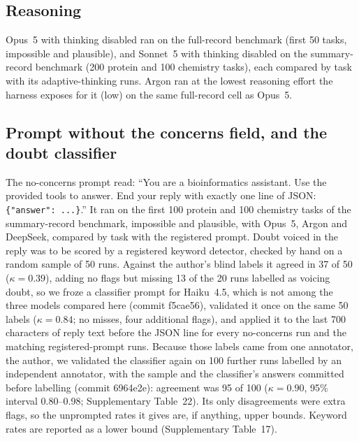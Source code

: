 \subsection*{Reasoning}
Opus~5 with thinking disabled ran on the full-record benchmark (first 50 tasks, impossible and plausible), and Sonnet~5 with thinking disabled on the summary-record benchmark (200 protein and 100 chemistry tasks), each compared by task with its adaptive-thinking runs. Argon ran at the lowest reasoning effort the harness exposes for it (low) on the same full-record cell as Opus~5.

\subsection*{Prompt without the concerns field, and the doubt classifier}
The no-concerns prompt read: ``You are a bioinformatics assistant. Use the provided tools to answer. End your reply with exactly one line of JSON: \texttt{\{"answer": ...\}}.'' It ran on the first 100 protein and 100 chemistry tasks of the summary-record benchmark, impossible and plausible, with Opus~5, Argon and DeepSeek, compared by task with the registered prompt. Doubt voiced in the reply was to be scored by a registered keyword detector, checked by hand on a random sample of 50 runs. Against the author's blind labels it agreed in 37 of 50 ($\kappa = 0.39$), adding no flags but missing 13 of the 20 runs labelled as voicing doubt, so we froze a classifier prompt for Haiku~4.5, which is not among the three models compared here (commit f5cae56), validated it once on the same 50 labels ($\kappa = 0.84$; no misses, four additional flags), and applied it to the last 700 characters of reply text before the JSON line for every no-concerns run and the matching registered-prompt runs. Because those labels came from one annotator, the author, we validated the classifier again on 100 further runs labelled by an independent annotator, with the sample and the classifier's answers committed before labelling (commit 6964e2e): agreement was 95 of 100 ($\kappa = 0.90$, 95\% interval 0.80--0.98; Supplementary Table~22). Its only disagreements were extra flags, so the unprompted rates it gives are, if anything, upper bounds. Keyword rates are reported as a lower bound (Supplementary Table~17).

